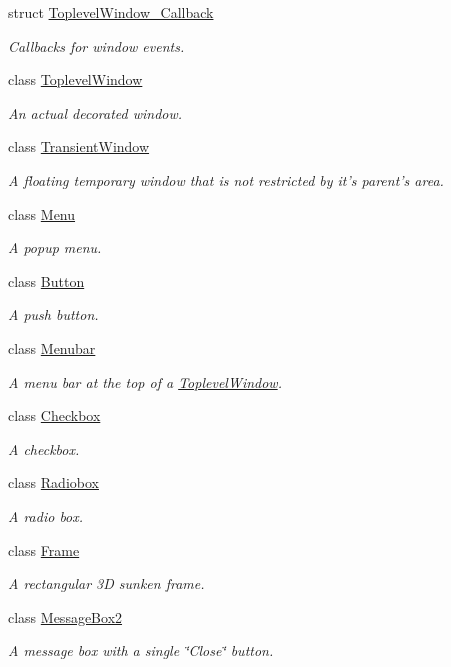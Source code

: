 \begin{DoxyCompactItemize}
struct \hyperlink{structGUI_1_1ToplevelWindow__Callback}{Toplevel\-Window\-\_\-\-Callback}
\begin{DoxyCompactList}\small\item\em Callbacks for window events. \end{DoxyCompactList}\item 
class \hyperlink{classGUI_1_1ToplevelWindow}{Toplevel\-Window}
\begin{DoxyCompactList}\small\item\em An actual decorated window. \end{DoxyCompactList}\item 
class \hyperlink{classGUI_1_1TransientWindow}{Transient\-Window}
\begin{DoxyCompactList}\small\item\em A floating temporary window that is not restricted by it's parent's area. \end{DoxyCompactList}\item 
class \hyperlink{classGUI_1_1Menu}{Menu}
\begin{DoxyCompactList}\small\item\em A popup menu. \end{DoxyCompactList}\item 
class \hyperlink{classGUI_1_1Button}{Button}
\begin{DoxyCompactList}\small\item\em A push button. \end{DoxyCompactList}\item 
class \hyperlink{classGUI_1_1Menubar}{Menubar}
\begin{DoxyCompactList}\small\item\em A menu bar at the top of a \hyperlink{classGUI_1_1ToplevelWindow}{Toplevel\-Window}. \end{DoxyCompactList}\item 
class \hyperlink{classGUI_1_1Checkbox}{Checkbox}
\begin{DoxyCompactList}\small\item\em A checkbox. \end{DoxyCompactList}\item 
class \hyperlink{classGUI_1_1Radiobox}{Radiobox}
\begin{DoxyCompactList}\small\item\em A radio box. \end{DoxyCompactList}\item 
class \hyperlink{classGUI_1_1Frame}{Frame}
\begin{DoxyCompactList}\small\item\em A rectangular 3\-D sunken frame. \end{DoxyCompactList}\item 
class \hyperlink{classGUI_1_1MessageBox2}{Message\-Box2}
\begin{DoxyCompactList}\small\item\em A message box with a single \char`\"{}\-Close\char`\"{} button. \end{DoxyCompactList}\end{DoxyCompactItemize}
